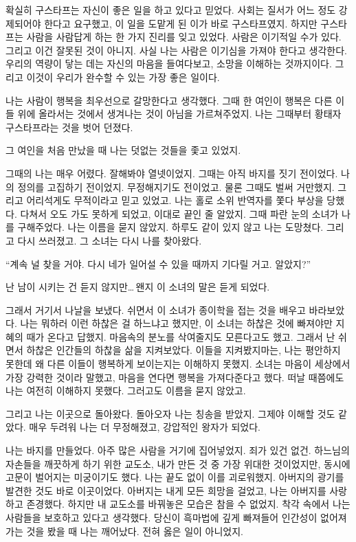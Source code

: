 \begin{letter}
확실히 구스타프는 자신이 좋은 일을 하고 있다고 믿었다. 사회는 질서가 어느 정도 강제되어야 한다고 요구했고, 이 일을 도맡게 된 이가 바로 구스타프였지. 하지만 구스타프는 사람을 사람답게 하는 한 가지 진리를 잊고 있었다. 사람은 이기적일 수가 있다. 그리고 이건 잘못된 것이 아니지. 사실 나는 사람은 이기심을 가져야 한다고 생각한다. 우리의 역량이 닿는 데는 자신의 마음을 들여다보고, 소망을 이해하는 것까지이다. 그리고 이것이 우리가 완수할 수 있는 가장 좋은 일이다.

나는 사람이 행복을 최우선으로 갈망한다고 생각했다. 그때 한 여인이 행복은 다른 이들 위에 올라서는 것에서 생겨나는 것이 아님을 가르쳐주었지. 나는 그때부터 황태자 구스타프라는 것을 벗어 던졌다.

그 여인을 처음 만났을 때 나는 덧없는 것들을 좇고 있었지.

그때의 나는 매우 어렸다. 잘해봐야 열넷이었지. 그때는 아직 바지를 짓기 전이었다. 나의 정의를 고집하기 전이었지. 무정해지기도 전이었고. 물론 그때도 벌써 거만했지. 그리고 어리석게도 무적이라고 믿고 있었고. 나는 홀로 소위 반역자를 쫓다 부상을 당했다. 다쳐서 오도 가도 못하게 되었고, 이대로 끝인 줄 알았지. 그때 파란 눈의 소녀가 나를 구해주었다. 나는 이름을 묻지 않았지. 하루도 같이 있지 않고 나는 도망쳤다. 그리고 다시 쓰러졌고. 그 소녀는 다시 나를 찾아왔다.

``계속 널 찾을 거야. 다시 네가 일어설 수 있을 때까지 기다릴 거고. 알았지?''

난 남이 시키는 건 듣지 않지만\ldots\,왠지 이 소녀의 말은 듣게 되었다.

그래서 거기서 나날을 보냈다. 쉬면서 이 소녀가 종이학을 접는 것을 배우고 바라보았다. 나는 뭐하러 이런 하찮은 걸 하느냐고 했지만, 이 소녀는 하찮은 것에 빠져야만 지혜의 때가 온다고 답했지. 마음속의 분노를 삭여줄지도 모른다고도 했고. 그래서 난 쉬면서 하찮은 인간들의 하찮을 삶을 지켜보았다. 이들을 지켜봤지마는, 나는 평안하지 못한데 왜 다른 이들이 행복하게 보이는지는 이해하지 못했지. 소녀는 마음이 세상에서 가장 강력한 것이라 말했고, 마음을 연다면 행복을 가져다준다고 했다. 떠날 때쯤에도 나는 여전히 이해하지 못했다. 그러고도 이름을 묻지 않았고.

그리고 나는 이곳으로 돌아왔다. 돌아오자 나는 칭송을 받았지. 그제야 이해할 것도 같았다. 매우 두려워 나는 더 무정해졌고, 강압적인 왕자가 되었다.

나는 바지를 만들었다. 아주 많은 사람을 거기에 집어넣었지. 죄가 있건 없건. 하느님의 자손들을 깨끗하게 하기 위한 교도소, 내가 만든 것 중 가장 위대한 것이었지만, 동시에 고문이 벌어지는 미궁이기도 했다. 나는 끝도 없이 이를 괴로워했지. 아버지의 광기를 발견한 것도 바로 이곳이었다. 아버지는 내게 모든 희망을 걸었고, 나는 아버지를 사랑하고 존경했다. 하지만 내 교도소를 바꿔놓은 모습은 참을 수 없었지. 착각 속에서 나는 사람들을 보호하고 있다고 생각했다. 당신이 흑마법에 깊게 빠져들어 인간성이 없어져 가는 것을 봤을 때 나는 깨어났다. 전혀 옳은 일이 아니었지.


\end{letter}
